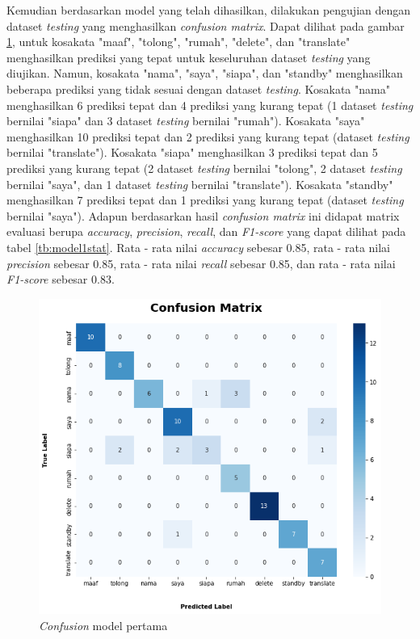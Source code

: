 Kemudian berdasarkan model yang telah dihasilkan, dilakukan pengujian dengan dataset \emph{testing} yang menghasilkan \emph{confusion matrix}. Dapat dilihat pada gambar \ref{fig:model1-cf}, untuk kosakata "maaf", "tolong", "rumah", "delete", dan "translate" menghasilkan prediksi yang tepat untuk keseluruhan dataset \emph{testing} yang diujikan. Namun, kosakata "nama", "saya", "siapa", dan "standby" menghasilkan beberapa prediksi yang tidak sesuai dengan dataset \emph{testing}. Kosakata "nama" menghasilkan 6 prediksi tepat dan 4 prediksi yang kurang tepat (1 dataset \emph{testing} bernilai "siapa" dan 3 dataset \emph{testing} bernilai "rumah"). Kosakata "saya" menghasilkan 10 prediksi tepat dan 2 prediksi yang kurang tepat (dataset \emph{testing} bernilai "translate"). Kosakata "siapa" menghasilkan 3 prediksi tepat dan 5 prediksi yang kurang tepat (2 dataset \emph{testing} bernilai "tolong",  2 dataset \emph{testing} bernilai "saya", dan 1 dataset \emph{testing} bernilai "translate"). Kosakata "standby" menghasilkan 7 prediksi tepat dan 1 prediksi yang kurang tepat (dataset \emph{testing} bernilai "saya"). Adapun berdasarkan hasil \emph{confusion matrix} ini didapat matrix evaluasi berupa \emph{accuracy}, \emph{precision}, \emph{recall}, dan \emph{F1-score} yang dapat dilihat pada tabel \ref{tb:model1stat}. Rata - rata nilai \emph{accuracy} sebesar 0.85, rata - rata nilai \emph{precision} sebesar 0.85, rata - rata nilai \emph{recall} sebesar 0.85, dan rata - rata nilai \emph{F1-score} sebesar 0.83.

\begin{figure}[H]
  \centering

  \includegraphics[scale=0.6]{gambar/bab4-uji-model-worst-cf.png}

  \caption{\emph{Confusion} model pertama}
  \label{fig:model1-cf}
\end{figure}

